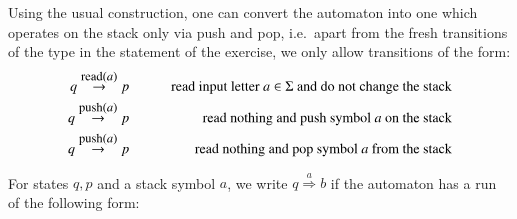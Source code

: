 	 {
Using the usual construction, one can convert the automaton into one which operates on the stack only via push and pop, i.e.~apart from the fresh transitions of the type in the statement of the exercise, we only allow transitions of the form:
	\begin{eqnarray*}
			q \stackrel  {\text{\small read($a$)}} \to p & \quad &\quad\mbox{read input letter $a \in \Sigma$ and do not change the stack}\\
					q \stackrel  {\text{\small push($a$)}} \to p & \quad &\quad\mbox{read nothing and push symbol $a$ on the stack}\\
					q \stackrel  {\text{\small push($a$)}} \to p & \quad &\quad\mbox{read nothing and pop symbol $a$ from the stack}
		\end{eqnarray*}

For states $q,p$ and a stack symbol $a$, we write $q \stackrel a \Rightarrow b$ if  the automaton has a run of the following form:

}
